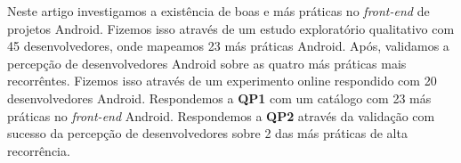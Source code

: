 Neste artigo investigamos a existência de boas e más práticas no \textit{front-end} de projetos Android. Fizemos isso através de um estudo exploratório qualitativo com 45 desenvolvedores, onde mapeamos 23 más práticas Android. Após, validamos a percepção de desenvolvedores Android sobre as quatro más práticas mais recorrêntes. Fizemos isso através de um experimento online respondido com 20 desenvolvedores Android. Respondemos a \textbf{QP1} com um catálogo com 23 más práticas no \textit{front-end} Android. Respondemos a \textbf{QP2} através da validação com sucesso da percepção de desenvolvedores sobre 2 das más práticas de alta recorrência.









